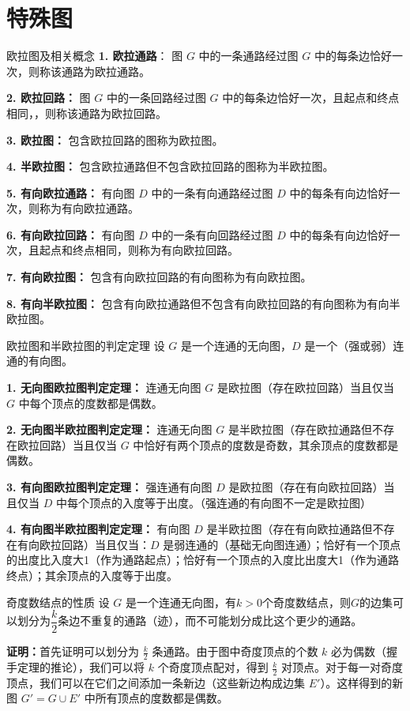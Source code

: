 \section{特殊图}
\begin{definition}{欧拉图及相关概念}{}
\textbf{1. 欧拉通路}：
图 $G$ 中的一条通路经过图 $G$ 中的每条边恰好一次，则称该通路为欧拉通路。

\textbf{2. 欧拉回路：}
图 $G$ 中的一条回路经过图 $G$ 中的每条边恰好一次，且起点和终点相同，，则称该通路为欧拉回路。

\textbf{3. 欧拉图：}
包含欧拉回路的图称为欧拉图。

\textbf{4. 半欧拉图：}
包含欧拉通路但不包含欧拉回路的图称为半欧拉图。

\textbf{5. 有向欧拉通路：}
有向图 $D$ 中的一条有向通路经过图 $D$ 中的每条有向边恰好一次，则称为有向欧拉通路。

\textbf{6. 有向欧拉回路：}
有向图 $D$ 中的一条有向回路经过图 $D$ 中的每条有向边恰好一次，且起点和终点相同，则称为有向欧拉回路。

\textbf{7. 有向欧拉图：}
包含有向欧拉回路的有向图称为有向欧拉图。

\textbf{8. 有向半欧拉图：}
包含有向欧拉通路但不包含有向欧拉回路的有向图称为有向半欧拉图。
\end{definition}
\begin{theorem}{欧拉图和半欧拉图的判定定理}{}
设 $G$ 是一个连通的无向图，$D$ 是一个（强或弱）连通的有向图。

\textbf{1. 无向图欧拉图判定定理：}
连通无向图 $G$ 是欧拉图（存在欧拉回路）当且仅当 $G$ 中每个顶点的度数都是偶数。

\textbf{2. 无向图半欧拉图判定定理：}
连通无向图 $G$ 是半欧拉图（存在欧拉通路但不存在欧拉回路）当且仅当 $G$ 中恰好有两个顶点的度数是奇数，其余顶点的度数都是偶数。

\textbf{3. 有向图欧拉图判定定理：}
强连通有向图 $D$ 是欧拉图（存在有向欧拉回路）当且仅当 $D$ 中每个顶点的入度等于出度。（强连通的有向图不一定是欧拉图）

\textbf{4. 有向图半欧拉图判定定理：}
有向图 $D$ 是半欧拉图（存在有向欧拉通路但不存在有向欧拉回路）当且仅当：$D$ 是弱连通的（基础无向图连通）；恰好有一个顶点的出度比入度大1（作为通路起点）；恰好有一个顶点的入度比出度大1（作为通路终点）；其余顶点的入度等于出度。
\end{theorem}
\begin{theorem}{奇度数结点的性质}{}
    设 $G$ 是一个连通无向图，有$k>0$个奇度数结点，则$G$的边集可以划分为$\dfrac{k}2$条边不重复的通路（迹），而不可能划分成比这个更少的通路。
\end{theorem}
\textbf{证明：}首先证明可以划分为 $\frac{k}{2}$ 条通路。由于图中奇度顶点的个数 $k$ 必为偶数（握手定理的推论），我们可以将 $k$ 个奇度顶点配对，得到 $\frac{k}{2}$ 对顶点。对于每一对奇度顶点，我们可以在它们之间添加一条新边（这些新边构成边集 $E'$）。这样得到的新图 $G' = G \cup E'$ 中所有顶点的度数都是偶数。

